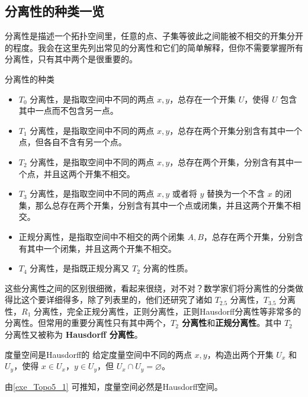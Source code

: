 

\subsection{分离性的种类一览}

分离性是描述一个拓扑空间里，任意的点、子集等彼此之间能被不相交的开集分开的程度。我会在这里先列出常见的分离性和它们的简单解释，但你不需要掌握所有分离性，只有其中两个是很重要的。

\begin{definition}{分离性的种类}\label{def_Topo5_1}
\begin{itemize}
\item $T_0$ 分离性，是指取空间中不同的两点 $x,y$，总存在一个开集 $U$，使得 $U$ 包含其中一点而不包含另一点。
\item $T_1$ 分离性，是指取空间中不同的两点 $x,y$，总存在两个开集分别含有其中一个点，但各自不含有另一个点。
\item $T_2$ 分离性，是指取空间中不同的两点 $x,y$，总存在两个开集，分别含有其中一个点，并且这两个开集不相交。
\item $T_3$ 分离性，是指取空间中不同的两点 $x,y$ 或者将 $y$ 替换为一个不含 $x$ 的闭集，那么总存在两个开集，分别含有其中一个点或闭集，并且这两个开集不相交。
\item 正规分离性，是指取空间中不相交的两个闭集 $A, B$，总存在两个开集，分别含有其中一个闭集，并且这两个开集不相交。
\item $T_4$ 分离性，是指既正规分离又 $T_2$ 分离的性质。
\end{itemize}
\end{definition}

这些分离性之间的区别很细微，看起来很绕，对不对？数学家们将分离性的分类做得比这个要详细得多，除了列表里的，他们还研究了诸如 $T_{2.5}$ 分离性，$T_{3.5}$ 分离性，$R_1$ 分离性，完全正规分离性，正则分离性，正则Hausdorff分离性等非常多的分离性。但常用的重要分离性只有其中两个，\textbf{$T_2$ 分离性}和\textbf{正规分离性}。其中 $T_2$ 分离性又被称为 \textbf{Hausdorff 分离性}。

\begin{exercise}{度量空间是Hausdorff的}\label{exe_Topo5_1}
给定度量空间中不同的两点 $x, y$，构造出两个开集 $U_x$ 和 $U_y$，使得 $x\in U_x$，$y\in U_y$，但 $U_x\cap U_y=\varnothing$。
\end{exercise}

\begin{corollary}{}
由\autoref{exe_Topo5_1} 可推知，度量空间必然是Hausdorff空间。
\end{corollary}

